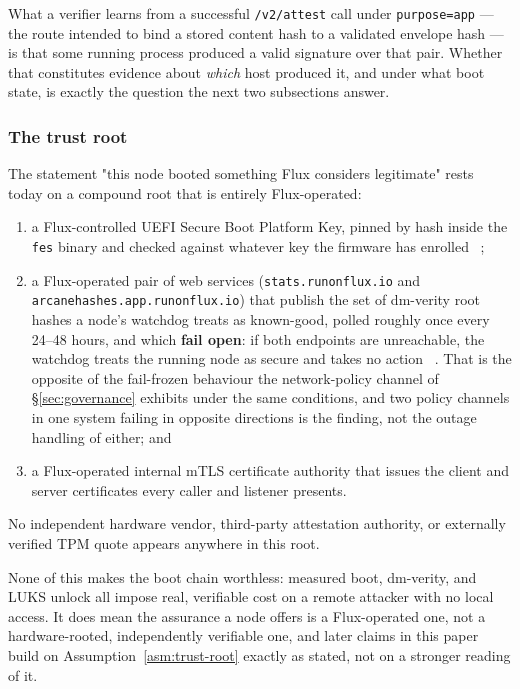 What a verifier learns from a successful \texttt{/v2/attest} call under \texttt{purpose=app} — the
route intended to bind a stored content hash to a validated envelope hash — is that some running
\fluxsas process produced a valid signature over that pair. Whether that constitutes evidence about
\emph{which} host produced it, and under what boot state, is exactly the question the next two
subsections answer.

\subsubsection{The trust root}

\begin{assumption}
\label{asm:trust-root}
The statement "this node booted something Flux considers legitimate" rests today on a compound
root that is entirely Flux-operated:
\begin{enumerate}
  \item a Flux-controlled UEFI Secure Boot Platform Key, pinned by hash inside the \texttt{fes}
  binary and checked against whatever key the firmware has enrolled
  \shipped~;
  \item a Flux-operated pair of web services (\texttt{stats.\allowbreak{}runonflux.\allowbreak{}io} and
  \texttt{arcanehashes.\allowbreak{}app.\allowbreak{}runonflux.\allowbreak{}io}) that publish the set of dm-verity root hashes a node's
  watchdog treats as known-good, polled roughly once every 24--48 hours, and which \textbf{fail
  open}: if both endpoints are unreachable, the watchdog treats the running node as secure and takes
  no action \shipped~. That is the opposite of the fail-frozen behaviour the network-policy channel of
  \S\ref{sec:governance} exhibits under the same conditions, and two policy channels in one system
  failing in opposite directions is the finding, not the outage handling of either; and
  \item a Flux-operated internal mTLS certificate authority that issues the client and server
  certificates every \fluxsas caller and listener presents.
\end{enumerate}
No independent hardware vendor, third-party attestation authority, or externally verified TPM
quote appears anywhere in this root.
\end{assumption}

None of this makes the boot chain worthless: measured boot, dm-verity, and LUKS unlock all impose
real, verifiable cost on a remote attacker with no local access. It does mean the assurance a node
offers is a Flux-operated one, not a hardware-rooted, independently verifiable one, and later
claims in this paper build on Assumption~\ref{asm:trust-root} exactly as stated, not on a stronger
reading of it.

